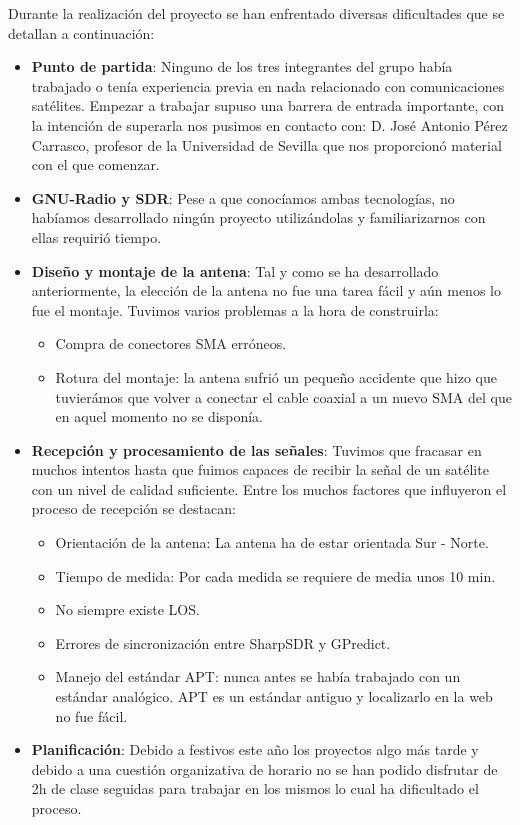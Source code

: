 \documentclass[a4paper,openright,12pt]{article}
\begin{document}
Durante la realización del proyecto se han enfrentado diversas dificultades que se detallan a continuación:
\begin{itemize}
    \item \textbf{Punto de partida}: Ninguno de los tres integrantes del grupo había trabajado o tenía experiencia previa en nada relacionado con comunicaciones satélites. Empezar a trabajar supuso una barrera de entrada importante, con la intención de superarla nos pusimos en contacto con: D. José Antonio Pérez Carrasco, profesor de la Universidad de Sevilla que nos proporcionó material con el que comenzar.
    \item \textbf{GNU-Radio y SDR}: Pese a que conocíamos ambas tecnologías, no habíamos desarrollado ningún proyecto utilizándolas y familiarizarnos con ellas requirió tiempo.
    \item \textbf{Diseño y montaje de la antena}: Tal y como se ha desarrollado anteriormente, la elección de la antena no fue una tarea fácil y aún menos lo fue el montaje. Tuvimos varios problemas a la hora de construirla:
    \begin{itemize}
        \item Compra de conectores SMA erróneos.
        \item Rotura del montaje: la antena sufrió un pequeño accidente que hizo que tuvierámos que volver a conectar el cable coaxial a un nuevo SMA del que en aquel momento no se disponía.
    \end{itemize}
    \item \textbf{Recepción y procesamiento de las señales}: Tuvimos que fracasar en muchos intentos hasta que fuimos capaces de recibir la señal de un satélite con un nivel de calidad suficiente. Entre los muchos factores que influyeron el proceso de recepción se destacan:
    \begin{itemize}
        \item Orientación de la antena: La antena ha de estar orientada Sur - Norte. 
        \item Tiempo de medida: Por cada medida se requiere de media unos 10 min.
        \item No siempre existe LOS.
        \item Errores de sincronización entre SharpSDR y GPredict.
        \item Manejo del estándar APT: nunca antes se había trabajado con un estándar analógico. APT es un estándar antiguo y localizarlo en la web no fue fácil.
    \end{itemize}
    \item \textbf{Planificación}: Debido a festivos este año los proyectos algo más tarde y debido a una cuestión organizativa de horario no se han podido disfrutar de 2h de clase seguidas para trabajar en los mismos lo cual ha dificultado el proceso.
\end{itemize}
\end{document}

